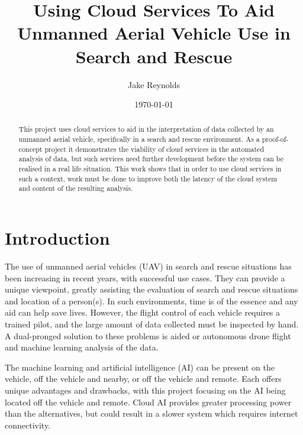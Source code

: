 \documentclass{article}
\begin{document}
\begin{titlingpage}

\title{Using Cloud Services To Aid Unmanned Aerial Vehicle Use in Search and Rescue}
\author{Jake Reynolds}
\date{\today}
\maketitle

\vspace*{\fill}

\begin{abstract}
\begin{large}
This project uses cloud services to aid in the interpretation of data collected by an unmanned aerial vehicle, specifically in a search and rescue environment. As a proof-of-concept project it demonstrates the viability of cloud services in the automated analysis of data, but such services need further development before the system can be realised in a real life situation. This work shows that in order to use cloud services in such a context, work must be done to improve both the latency of the cloud system and content of the resulting analysis.
\end{large}
\end{abstract}
\vspace*{\fill}
\end{titlingpage}

\tableofcontents


\section{Introduction}
The use of unmanned aerial vehicles (UAV) in search and rescue situations has been increasing in recent years, with successful use cases\cite{UAVUseCase}. They can provide a unique viewpoint, greatly assisting the evaluation of search and rescue situations and location of a person(s). In such environments, time is of the essence and any aid can help save lives. However, the flight control of each vehicle requires a trained pilot, and the large amount of data collected must be inspected by hand. A dual-pronged solution to these problems is aided or autonomous drone flight and machine learning analysis of the data.

The machine learning and artificial intelligence (AI) can be present on the vehicle, off the vehicle and nearby, or off the vehicle and remote. Each offers unique advantages and drawbacks, with this project focusing on the AI being located off the vehicle and remote. Cloud AI provides greater processing power than the alternatives, but could result in a slower system which requires internet connectivity. 
\end{document}
